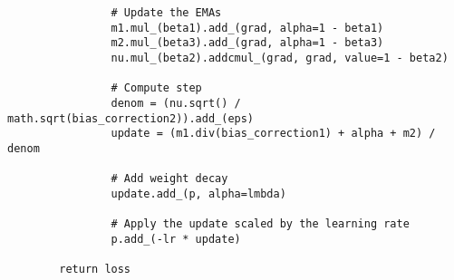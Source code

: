 \documentclass{article}
\begin{document}
\begin{lstlisting}
                # Update the EMAs
                m1.mul_(beta1).add_(grad, alpha=1 - beta1)
                m2.mul_(beta3).add_(grad, alpha=1 - beta3)
                nu.mul_(beta2).addcmul_(grad, grad, value=1 - beta2)

                # Compute step
                denom = (nu.sqrt() / math.sqrt(bias_correction2)).add_(eps)
                update = (m1.div(bias_correction1) + alpha + m2) / denom

                # Add weight decay
                update.add_(p, alpha=lmbda)

                # Apply the update scaled by the learning rate
                p.add_(-lr * update)

        return loss
\end{lstlisting}
\end{document}
